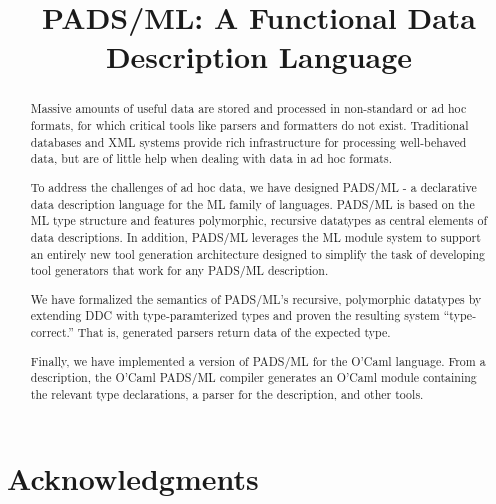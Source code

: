 \documentclass[nocopyrightspace]{sigplanconf}
\begin{document}
\title{PADS/ML: A Functional Data Description Language}
       {}
       {}



\maketitle{}

\begin{abstract}  

  Massive amounts of useful data are stored and processed in
  non-standard or ad hoc formats, for which critical tools like
  parsers and formatters do not exist. Traditional databases and XML
  systems provide rich infrastructure for processing well-behaved
  data, but are of little help when dealing with data in ad hoc
  formats.
 
  To address the challenges of ad hoc data, we have designed PADS/ML -
  a declarative data description language for the ML family of
  languages. PADS/ML is based on the ML type structure and features
  polymorphic, recursive datatypes as central elements of data
  descriptions. In addition, PADS/ML leverages the ML module system to
  support an entirely new tool generation architecture designed to
  simplify the task of developing tool generators that work for any
  PADS/ML description.

  We have formalized the semantics of PADS/ML's recursive, polymorphic
  datatypes by extending DDC with type-paramterized types and proven
  the resulting system ``type-correct.'' That is, generated parsers
  return data of the expected type.

  Finally, we have implemented a version of PADS/ML for the O'Caml
  language.  From a description, the O'Caml PADS/ML compiler generates
  an O'Caml module containing the relevant type declarations, a parser
  for the description, and other tools.

\end{abstract}












\section*{Acknowledgments}






\end{document}
